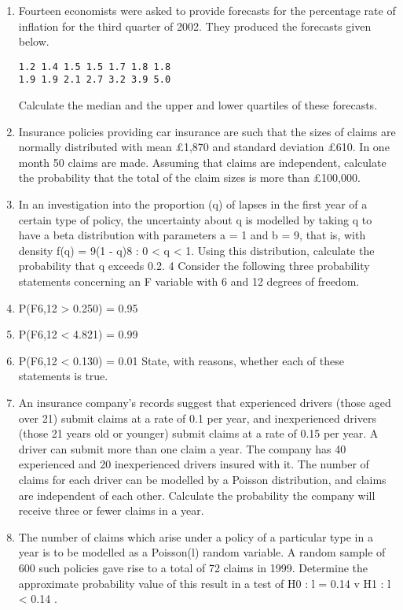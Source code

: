 \documentclass{article}
\begin{document}
\begin{enumerate}
\item  Fourteen economists were asked to provide forecasts for the percentage rate
of inflation for the third quarter of 2002. They produced the forecasts given
below.
\begin{verbatim}
1.2 1.4 1.5 1.5 1.7 1.8 1.8
1.9 1.9 2.1 2.7 3.2 3.9 5.0    
\end{verbatim}

Calculate the median and the upper and lower quartiles of these forecasts. 
\item Insurance policies providing car insurance are such that the sizes of claims are
normally distributed with mean £1,870 and standard deviation £610. In one
month 50 claims are made. Assuming that claims are independent, calculate
the probability that the total of the claim sizes is more than £100,000. 
\item  In an investigation into the proportion (q) of lapses in the first year of a
certain type of policy, the uncertainty about q is modelled by taking q to have a
beta distribution with parameters a = 1 and b = 9, that is, with density
f(q) = 9(1 - q)8 : 0 < q < 1.
Using this distribution, calculate the probability that q exceeds 0.2. 
4 Consider the following three probability statements concerning an F variable
with 6 and 12 degrees of freedom.
\item P(F6,12 > 0.250) = 0.95
\item P(F6,12 < 4.821) = 0.99
\item P(F6,12 < 0.130) = 0.01
State, with reasons, whether each of these statements is true. 
\item  An insurance company’s records suggest that experienced drivers (those aged
over 21) submit claims at a rate of 0.1 per year, and inexperienced drivers
(those 21 years old or younger) submit claims at a rate of 0.15 per year. A
driver can submit more than one claim a year. The company has 40
experienced and 20 inexperienced drivers insured with it.
The number of claims for each driver can be modelled by a Poisson
distribution, and claims are independent of each other. Calculate the
probability the company will receive three or fewer claims in a year. 


\item The number of claims which arise under a policy of a particular type in a year
is to be modelled as a Poisson(l) random variable. A random sample of 600
such policies gave rise to a total of 72 claims in 1999.
Determine the approximate probability value of this result in a test of
H0 : l = 0.14 v H1 : l < 0.14 . 
\end{enumerate}
\end{document}
